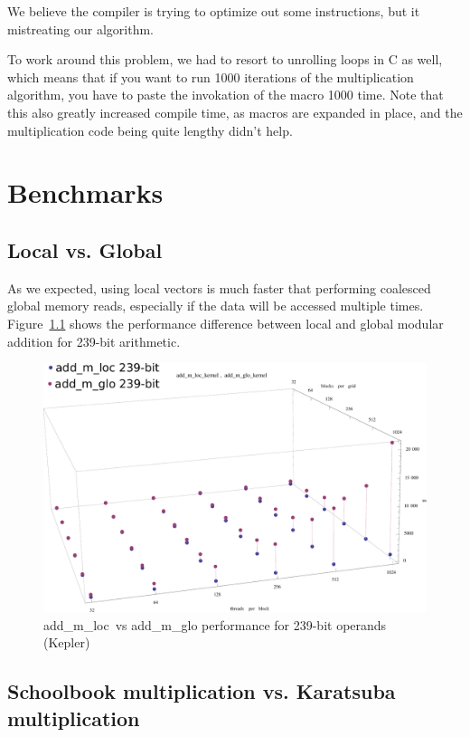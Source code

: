 \documentclass[12pt, a4paper]{report}
\begin{document}
We believe the compiler is trying to optimize out some instructions, but it mistreating
our algorithm.

To work around this problem, we had to resort to unrolling loops in C as well, which means that if you want to run
1000 iterations of the multiplication algorithm, you have to paste the invokation of the macro
1000 time.
Note that this also greatly increased compile time, as macros are expanded in place, and the multiplication
code being quite lengthy didn't help.

\chapter{Benchmarks}
\section{Local vs. Global}
As we expected, using local vectors is much faster that performing coalesced global
memory reads, especially if the data will be accessed multiple times.
Figure~\ref{fig:add_m_loc_vs_add_m_glo_kepler_239_duration} shows the performance
difference between local and global modular addition for 239-bit arithmetic.
\begin{figure}[h]
\centering
\includegraphics[scale=0.45]{figs/add_m_loc_vs_add_m_glo_kepler_239_duration}
\caption{add\_m\_loc\ vs add\_m\_glo performance for 239-bit operands (Kepler)}
\label{fig:add_m_loc_vs_add_m_glo_kepler_239_duration}
\end{figure}

\section{Schoolbook multiplication vs. Karatsuba multiplication}
\end{document}
